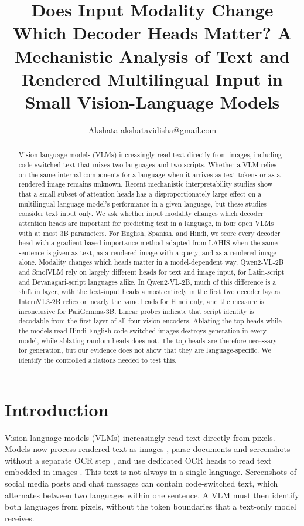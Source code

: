 \documentclass[10pt]{article}
\title{Does Input Modality Change Which Decoder Heads Matter? A Mechanistic Analysis of Text and Rendered Multilingual Input in Small Vision-Language Models}
\author{\name Akshata \email akshatavidisha@gmail.com}
\begin{document}
\maketitle

\begin{abstract}
Vision-language models (VLMs) increasingly read text directly from images, including code-switched text that mixes two languages and two scripts. Whether a VLM relies on the same internal components for a language when it arrives as text tokens or as a rendered image remains unknown. Recent mechanistic interpretability studies show that a small subset of attention heads has a disproportionately large effect on a multilingual language model's performance in a given language, but these studies consider text input only. We ask whether input modality changes which decoder attention heads are important for predicting text in a language, in four open VLMs with at most 3B parameters. For English, Spanish, and Hindi, we score every decoder head with a gradient-based importance method adapted from LAHIS when the same sentence is given as text, as a rendered image with a query, and as a rendered image alone. Modality changes which heads matter in a model-dependent way. Qwen2-VL-2B and SmolVLM rely on largely different heads for text and image input, for Latin-script and Devanagari-script languages alike. In Qwen2-VL-2B, much of this difference is a shift in layer, with the text-input heads almost entirely in the first two decoder layers. InternVL3-2B relies on nearly the same heads for Hindi only, and the measure is inconclusive for PaliGemma-3B. Linear probes indicate that script identity is decodable from the first layer of all four vision encoders. Ablating the top heads while the models read Hindi-English code-switched images destroys generation in every model, while ablating random heads does not. The top heads are therefore necessary for generation, but our evidence does not show that they are language-specific. We identify the controlled ablations needed to test this.
\end{abstract}

\section{Introduction}
\label{sec:intro}

Vision-language models (VLMs) increasingly read text directly from pixels. Models now process rendered text as images \citep{rust2023pixel, tschannen2023clippo}, parse documents and screenshots without a separate OCR step \citep{kim2022donut, lee2023pix2struct}, and use dedicated OCR heads to read text embedded in images \citep{baek2025ocr}. This text is not always in a single language. Screenshots of social media posts and chat messages can contain code-switched text, which alternates between two languages within one sentence. A VLM must then identify both languages from pixels, without the token boundaries that a text-only model receives.
\end{document}
